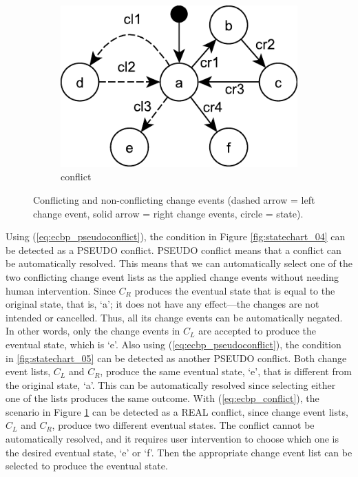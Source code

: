 \begin{figure}[ht]
\begin{subfigure}[t]{0.48\linewidth}
	\includegraphics[width=\linewidth]{statechart_06}
	\caption{conflict}
	\label{fig:statechart_06}
\end{subfigure}
\caption{Conflicting and non-conflicting change events (dashed arrow = left change event, solid arrow = right change events, circle = state).}
\label{fig:conflict_states}
\end{figure}

Using (\ref{eq:ecbp_pseudoconflict}), the condition in Figure \ref{fig:statechart_04} can be detected as a \textsf{PSEUDO} conflict. \textsf{PSEUDO} conflict means that a conflict can be automatically resolved. This means that we can automatically select one of the two conflicting change event lists as the applied change events without needing human intervention. Since $C_{R}$ produces the eventual state that is equal to the original state, that is, ‘a’; it does not have any effect—the changes are not intended or cancelled. Thus, all its change events can be automatically negated. In other words, only the change events in $C_{L}$ are accepted to produce the eventual state, which is ‘e’. Also using (\ref{eq:ecbp_pseudoconflict}), the condition in \ref{fig:statechart_05} can be detected as another \textsf{PSEUDO} conflict. Both change event lists, $C_{L}$ and $C_{R}$, produce the same eventual state, ‘e’, that is different from the original state, ‘a’. This can be automatically resolved since selecting either one of the lists produces the same outcome. With (\ref{eq:ecbp_conflict}), the scenario in Figure \ref{fig:statechart_06} can be detected as a \textsf{REAL} conflict, since change event lists, $C_{L}$ and $C_{R}$, produce two different eventual states. The conflict cannot be automatically resolved, and it requires user intervention to choose which one is the desired eventual state, ‘e’ or ‘f’. Then the appropriate change event list can be selected to produce the eventual state.

